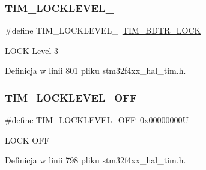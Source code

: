 \subsubsection{\texorpdfstring{T\+I\+M\+\_\+\+L\+O\+C\+K\+L\+E\+V\+E\+L\+\_}{TIM\_LOCKLEVEL\_3}}
{\footnotesize\ttfamily \#define T\+I\+M\+\_\+\+L\+O\+C\+K\+L\+E\+V\+E\+L\+\_~\hyperlink{group___peripheral___registers___bits___definition_ga7e4215d17f0548dfcf0b15fe4d0f4651}{T\+I\+M\+\_\+\+B\+D\+T\+R\+\_\+\+L\+O\+CK}}

L\+O\+CK Level 3 

Definicja w linii 801 pliku stm32f4xx\+\_\+hal\+\_\+tim.\+h.

\mbox{\label{group___t_i_m___lock__level_ga304aece56a9391a4d9b1016144d98fbd}} 
\subsubsection{\texorpdfstring{T\+I\+M\+\_\+\+L\+O\+C\+K\+L\+E\+V\+E\+L\+\_\+\+O\+FF}{TIM\_LOCKLEVEL\_OFF}}
{\footnotesize\ttfamily \#define T\+I\+M\+\_\+\+L\+O\+C\+K\+L\+E\+V\+E\+L\+\_\+\+O\+FF~0x00000000U}

L\+O\+CK O\+FF 

Definicja w linii 798 pliku stm32f4xx\+\_\+hal\+\_\+tim.\+h.

